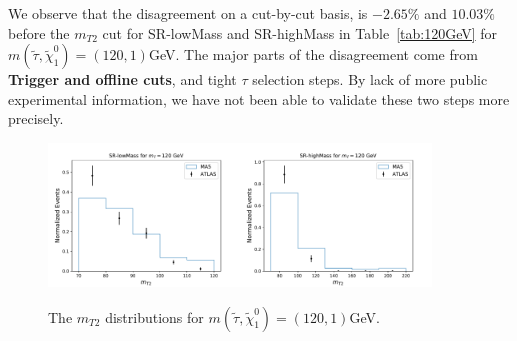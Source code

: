\documentclass{ws-mpla}
\begin{document}
We observe that the disagreement on a cut-by-cut basis, is $-2.65\%$ and $10.03\%$ before the $m_{T2}$ cut for SR-lowMass and SR-highMass in Table~\ref{tab:120GeV} for $m(\tilde{\tau},\tilde{\chi}^0_1)=(120,1) $GeV. The major parts of the disagreement come from \textbf{Trigger and offline cuts}, and tight $\tau$ selection steps. By lack of more public experimental information, we have not been able to validate these two steps more precisely.
\begin{figure}[h!]
  \centerline{\includegraphics[width=2.0in]{m120_norm_1}\includegraphics[width=2.0in]{m120_norm_2}}
  \vspace*{8pt}
  \caption{The $m_{T2}$ distributions for $m(\tilde{\tau},\tilde{\chi}^0_1)=(120,1) $GeV.\protect\label{fig:m120_norm}}
\end{figure}
\end{document}
